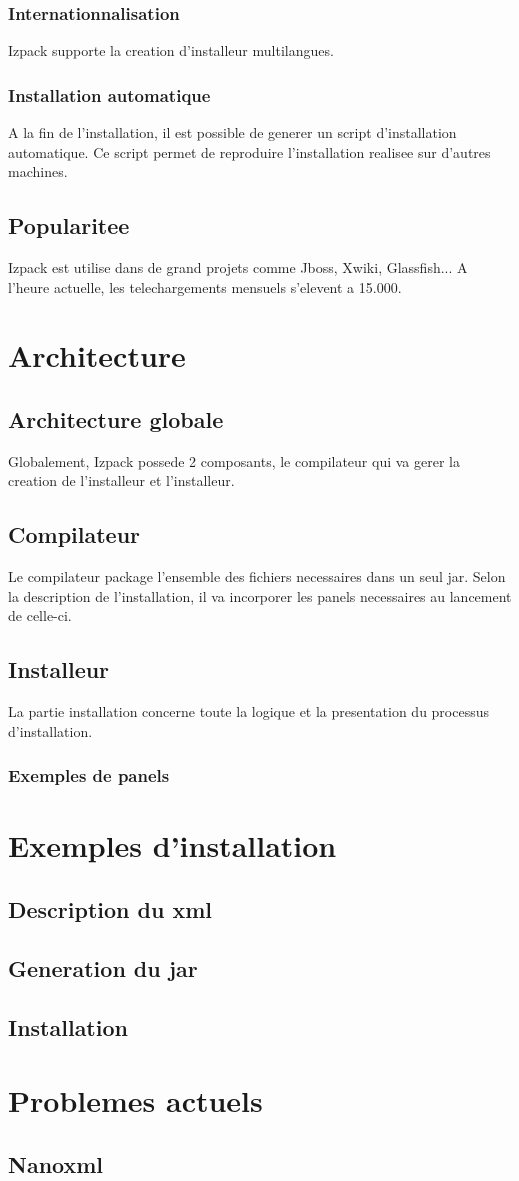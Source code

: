 \subsubsection{Internationnalisation}
Izpack supporte la creation d'installeur multilangues. 
\subsubsection{Installation automatique}
A la fin de l'installation, il est possible de generer un script d'installation automatique. Ce script permet de reproduire l'installation realisee sur d'autres machines.
\subsection{Popularitee}
Izpack est utilise dans de grand projets comme Jboss, Xwiki, Glassfish... A l'heure actuelle, les telechargements mensuels s'elevent a 15.000.
\section{Architecture}
\subsection{Architecture globale}
Globalement, Izpack possede 2 composants, le compilateur qui va gerer la creation de l'installeur et l'installeur.
\subsection{Compilateur}
Le compilateur package l'ensemble des fichiers necessaires dans un seul jar. Selon la description de l'installation, il va incorporer les panels necessaires au lancement de celle-ci. 
\subsection{Installeur}
La partie installation concerne toute la logique et la presentation du processus d'installation. 
\subsubsection{Exemples de panels}

\section{Exemples d'installation}
\subsection{Description du xml}
\subsection{Generation du jar}
\subsection{Installation}
\section{Problemes actuels}
\subsection{Nanoxml}